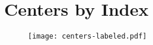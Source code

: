 \chapter{Centers by Index}\label{app:centers-index}
\vspace{-3em}
\begin{figure}[H]
    \texttt{[image: centers-labeled.pdf]}
\end{figure}
